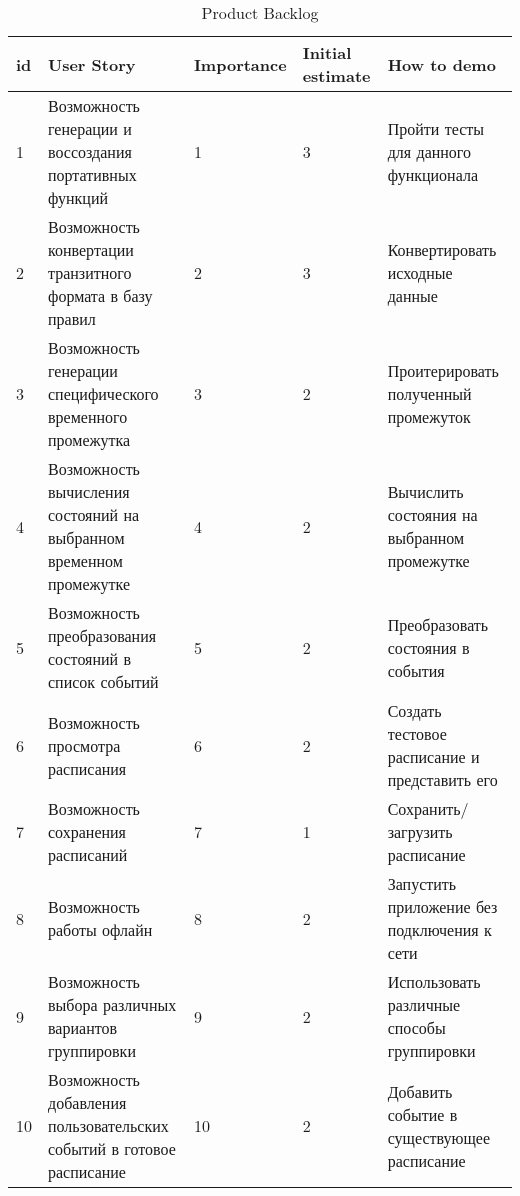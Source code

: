 {
\small
{}
\begin{longtable}{| p{0.5cm} | p{5cm} | p{2cm} | p{1.5cm} | p{4.8cm} |}
  \caption{Product Backlog} \label{tbl:product-backlog} \\
  \hline id & User Story                                                           & Importance & Initial estimate & How to demo \\
  \hline 1  & Возможность генерации и воссоздания портативных функций              & 1          & 3                & Пройти тесты для данного функционала \\
  \hline 2  & Возможность конвертации транзитного формата в базу правил            & 2          & 3                & Конвертировать исходные данные \\
  \hline 3  & Возможность генерации специфического временного промежутка           & 3          & 2                & Проитерировать полученный промежуток \\
  \hline 4  & Возможность вычисления состояний на выбранном временном промежутке   & 4          & 2                & Вычислить состояния на выбранном промежутке \\
  \hline 5  & Возможность преобразования состояний в список событий                & 5          & 2                & Преобразовать состояния в события \\
  \hline 6  & Возможность просмотра расписания                                     & 6          & 2                & Создать тестовое расписание и представить его \\
  \hline 7  & Возможность сохранения расписаний                                    & 7          & 1                & Сохранить/загрузить расписание \\
  \hline 8  & Возможность работы офлайн                                            & 8          & 2                & Запустить приложение без подключения к сети \\
  \hline 9  & Возможность выбора различных вариантов группировки                   & 9          & 2                & Использовать различные способы группировки \\
  \hline 10 & Возможность добавления пользовательских событий в готовое расписание & 10         & 2                & Добавить событие в существующее расписание \\
  \hline
\end{longtable}
}

\clearpage